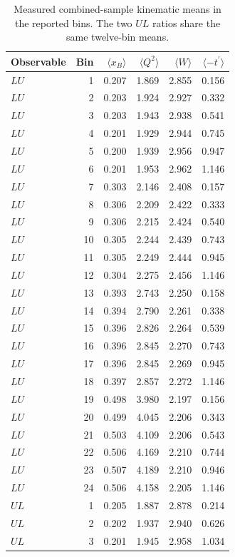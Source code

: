 \begin{longtable}{lrrrrr}
\caption{Measured combined-sample kinematic means in the reported bins. The two $UL$ ratios share the same twelve-bin means.}\\
\toprule Observable & Bin & $\langle x_B\rangle$ & $\langle Q^2\rangle$ & $\langle W\rangle$ & $\langle-t^\prime\rangle$\\\midrule\endhead
$LU$ & 1 & 0.207 & 1.869 & 2.855 & 0.156\\
$LU$ & 2 & 0.203 & 1.924 & 2.927 & 0.332\\
$LU$ & 3 & 0.203 & 1.943 & 2.938 & 0.541\\
$LU$ & 4 & 0.201 & 1.929 & 2.944 & 0.745\\
$LU$ & 5 & 0.200 & 1.939 & 2.956 & 0.947\\
$LU$ & 6 & 0.201 & 1.953 & 2.962 & 1.146\\
$LU$ & 7 & 0.303 & 2.146 & 2.408 & 0.157\\
$LU$ & 8 & 0.306 & 2.209 & 2.422 & 0.333\\
$LU$ & 9 & 0.306 & 2.215 & 2.424 & 0.540\\
$LU$ & 10 & 0.305 & 2.244 & 2.439 & 0.743\\
$LU$ & 11 & 0.305 & 2.249 & 2.444 & 0.945\\
$LU$ & 12 & 0.304 & 2.275 & 2.456 & 1.146\\
$LU$ & 13 & 0.393 & 2.743 & 2.250 & 0.158\\
$LU$ & 14 & 0.394 & 2.790 & 2.261 & 0.338\\
$LU$ & 15 & 0.396 & 2.826 & 2.264 & 0.539\\
$LU$ & 16 & 0.396 & 2.845 & 2.270 & 0.743\\
$LU$ & 17 & 0.396 & 2.845 & 2.269 & 0.945\\
$LU$ & 18 & 0.397 & 2.857 & 2.272 & 1.146\\
$LU$ & 19 & 0.498 & 3.980 & 2.197 & 0.156\\
$LU$ & 20 & 0.499 & 4.045 & 2.206 & 0.343\\
$LU$ & 21 & 0.503 & 4.109 & 2.206 & 0.543\\
$LU$ & 22 & 0.506 & 4.169 & 2.210 & 0.744\\
$LU$ & 23 & 0.507 & 4.189 & 2.210 & 0.946\\
$LU$ & 24 & 0.506 & 4.158 & 2.205 & 1.146\\
$UL$ & 1 & 0.205 & 1.887 & 2.878 & 0.214\\
$UL$ & 2 & 0.202 & 1.937 & 2.940 & 0.626\\
$UL$ & 3 & 0.201 & 1.945 & 2.958 & 1.034\\

\end{longtable}
